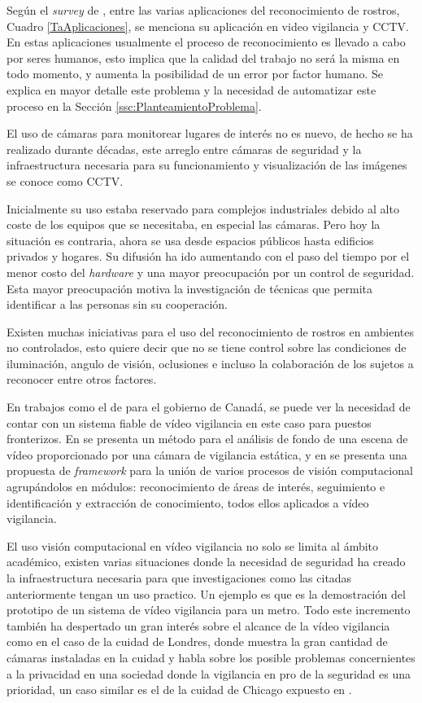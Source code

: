 Según el \textit{survey} de \citep{zhao2003face}, entre las varias aplicaciones del reconocimiento de rostros, Cuadro \ref{TaAplicaciones}, se menciona su aplicación en video vigilancia y \ac{CCTV}. En estas aplicaciones usualmente el proceso de reconocimiento es llevado a cabo por seres humanos, esto implica que la calidad del trabajo no será la misma en todo momento, y aumenta la posibilidad de un error por factor humano. Se explica en mayor detalle este problema y la necesidad de automatizar este proceso en la Sección \ref{ssc:PlanteamientoProblema}.

El uso de cámaras para monitorear lugares de interés no es nuevo, de hecho se ha realizado durante décadas, este arreglo entre cámaras de seguridad y la infraestructura necesaria para su funcionamiento y visualización de las imágenes se conoce como \ac{CCTV}. 

Inicialmente su uso estaba reservado para complejos industriales debido al alto coste de los equipos que se necesitaba, en especial las cámaras. Pero hoy la situación es contraria, ahora se usa desde espacios públicos hasta edificios privados y hogares. Su difusión ha ido aumentando con el paso del tiempo por el menor costo del \textit{hardware} y una mayor preocupación por un control de seguridad. Esta mayor preocupación motiva la investigación de técnicas que permita identificar a las personas sin su cooperación.

Existen muchas iniciativas para el uso del reconocimiento de rostros en ambientes no controlados, esto quiere decir que no se tiene control sobre las condiciones de iluminación, angulo de visión, oclusiones e incluso la colaboración de los sujetos a reconocer entre otros factores.
 
En trabajos como el de \citep{gorodnichy2014survey} para el gobierno de Canadá, se puede ver la necesidad de contar con un sistema fiable de vídeo vigilancia en este caso para puestos fronterizos. En  \citep{tian2005robust} se presenta un método para el análisis de fondo de una escena de vídeo proporcionado por una cámara de vigilancia estática, y en \citep{nazare2014smart} se presenta una propuesta de \textit{framework} para la unión de varios procesos de visión computacional agrupándolos en módulos: reconocimiento de áreas de interés, seguimiento e identificación y extracción de conocimiento, todos ellos aplicados a vídeo vigilancia.

El uso visión computacional en vídeo vigilancia no solo se limita al ámbito académico, existen varias situaciones donde la necesidad de seguridad ha creado la infraestructura necesaria para que investigaciones como las citadas anteriormente tengan un uso practico. Un ejemplo es \citep{odobez2012unsupervised} que es la demostración del prototipo de un sistema de vídeo vigilancia para un metro. Todo este incremento también ha despertado un gran interés sobre el alcance de la vídeo vigilancia como en el caso de la cuidad de Londres, donde \citep{wood2006report} muestra la gran cantidad de cámaras instaladas en la cuidad y habla sobre los posible problemas concernientes a la privacidad en una sociedad donde la vigilancia en pro de la seguridad es una prioridad, un caso similar es el de la cuidad de Chicago expuesto en \citep{schwartz2012chicago}.

